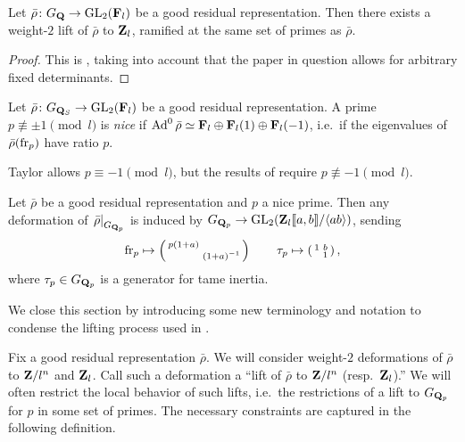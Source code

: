 \begin{theorem}\label{thm:always-can-lift}
Let $\bar\rho\colon G_{\mathbf{Q}} \to \operatorname{GL}_2(\mathbf{F}_l)$ be a good residual 
representation. Then there exists a weight-$2$ lift of $\bar\rho$ to $\mathbf{Z}_l$, 
ramified at the same set of primes as $\bar\rho$. 
\end{theorem}
\begin{proof}
This is \cite[Th.~1]{ramakrishna-2002}, taking into account that the paper in 
question allows for arbitrary fixed determinants. 
\end{proof}

\begin{definition}
Let $\bar\rho\colon G_{\mathbf{Q}_S} \to \operatorname{GL}_2(\mathbf{F}_l)$ be a good residual 
representation. A prime $p\not\equiv \pm 1\pmod l$ is \emph{nice} if 
$\operatorname{Ad}^0\bar\rho\simeq \mathbf{F}_l \oplus \mathbf{F}_l(1)\oplus \mathbf{F}_l(-1)$, i.e.~if the 
eigenvalues of $\bar\rho(\mathrm{fr}_p)$ have ratio $p$. 
\end{definition}

Taylor allows $p\equiv -1\pmod l$, but the results of \cite{pande-2011} 
require $p\not\equiv -1\pmod l$. 

\begin{theorem}[Ramakrishna]
Let $\bar\rho$ be a good residual representation and $p$ a nice prime. Then 
any deformation of $\left.\bar\rho\right|_{G_{\mathbf{Q}_p}}$ is induced by 
$G_{\mathbf{Q}_p} \to \operatorname{GL}_2(\mathbf{Z}_l\llbracket a,b \rrbracket / \langle a b\rangle)$, sending 
\[
	\mathrm{fr}_p \mapsto \left(\begin{smallmatrix} p(1+a) &  \\  & (1+a)^{-1} \end{smallmatrix}\right) \qquad \tau_p \mapsto \left(\begin{smallmatrix} 1 & b \\  & 1 \end{smallmatrix}\right) ,
\]
where $\tau_p\in G_{\mathbf{Q}_p}$ is a generator for tame inertia. 
\end{theorem}

We close this section by introducing some new terminology and notation to 
condense the lifting process used in \cite{khare-larsen-ramakrishna-2005}. 

Fix a good residual representation $\bar\rho$. We will consider weight-$2$ 
deformations of $\bar\rho$ to $\mathbf{Z}/l^n$ and $\mathbf{Z}_l$. Call such a deformation a 
``lift of $\bar\rho$ to $\mathbf{Z}/l^n$ (resp.~$\mathbf{Z}_l$).'' We will often restrict the 
local behavior of such lifts, i.e.~the restrictions of a lift to $G_{\mathbf{Q}_p}$ 
for $p$ in some set of primes. The necessary constraints are captured in the 
following definition. 

